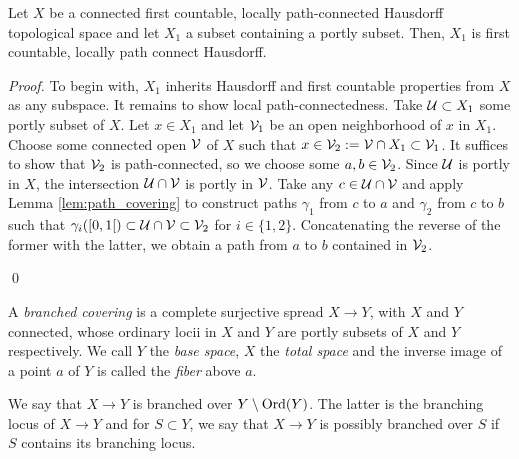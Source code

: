 \begin{lem}\label{lem:portly_first_countable} Let $X$ be a connected first countable, locally path-connected Hausdorff topological space and let $X_1$ a subset containing a portly subset. Then, $X_1$ is first countable, locally path connect Hausdorff.
\end{lem}
\begin{proof} To begin with, $X_1$ inherits Hausdorff and first countable properties from $X$ as any subspace. It remains to show local path-connectedness.
Take $\mathcal{U}\subset X_1$ some portly subset of $X$. 
 Let $x\in X_1$ and let $\mathcal V_1$ be an open neighborhood of $x$ in $X_1$. Choose some connected open $\mathcal V$ of $X$ such that $x\in \mathcal V_2:=\mathcal V\cap X_1 \subset \mathcal V_1$. 
 It suffices to show that $\mathcal V_2$ is path-connected, so we choose some $a,b\in \mathcal V_2$.
 Since $\mathcal{U}$ is portly in $X$, the intersection $\mathcal{U}\cap \mathcal V$ is portly in $\mathcal V$. Take any $c\in \mathcal{U}\cap \mathcal V$ and apply Lemma \ref{lem:path_covering} to construct paths $\gamma_1$ from $c$ to $a$ and $\gamma_2$ from $c$ to $b$ such that $\gamma_{i}([0,1[)\subset \mathcal{U}\cap \mathcal V\subset \mathcal V_2$ for $i\in \{1,2\}$. Concatenating the reverse of the former with the latter, we obtain a path from $a$ to $b$ contained in $\mathcal V_2$. 
 
\qed\end{proof}





\begin{defi}  A {\it branched covering} is a complete surjective spread $X\rightarrow Y$, with $X$ and $Y$ connected, whose ordinary locii in $X$ and $Y$ are portly subsets of $X$ and $Y$ respectively. We call $Y$ the {\it base space}, $X$ the {\it total space} and the inverse image of a point $a$ of $Y$ is called the {\it fiber} above $a$.
 
 We say that $X\rightarrow Y$ is branched over $Y\setminus \mathrm{Ord}(Y)$. The latter is the branching locus of $X\rightarrow Y$ and for $S\subset Y$, we say that $X\rightarrow Y$ is possibly branched over $S$ if $S$ contains its branching locus.

 \end{defi}
 


 
 
